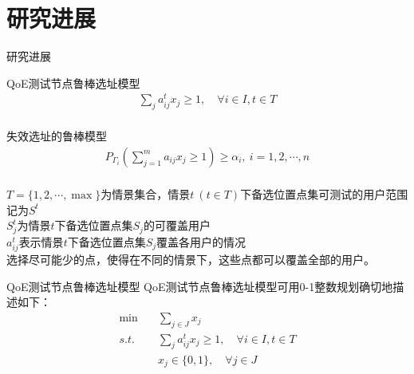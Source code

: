 \documentclass[10pt]{beamer}
\begin{document}
\section{研究进展}
\begin{frame}{研究进展}

  \begin{block}{QoE测试节点鲁棒选址模型}
    \begin{align*}
\sum_j a_{ij}^tx_j\geqslant 1,\quad \forall i\in I, t\in T\\
\end{align*}
  \end{block}

  \begin{block}{失效选址的鲁棒模型}
    \begin{align*}
    P_{\Gamma_i}(\sum_{j=1}^m a_{ij}x_j\geq 1)\geq \alpha_i,\ i=1,2,\cdots,n\\
  \end{align*}
  \end{block}

\end{frame}

\begin{frame}
$T=\{1,2,\cdots,\max\}$为情景集合，情景$t~(t\in T)$下备选位置点集可测试的用户范围记为$S^t$\\
$S^t_j$为情景$t$下备选位置点集$S_j$的可覆盖用户\\
$a_{ij}^t$表示情景$t$下备选位置点集$S_j$覆盖各用户的情况\\
选择尽可能少的点，使得在不同的情景下，这些点都可以覆盖全部的用户。
\begin{block}{QoE测试节点鲁棒选址模型}
  QoE测试节点鲁棒选址模型可用0-1整数规划确切地描述如下：
\begin{align*}
  \min \quad& \sum_{j\in J}x_j \\
s.t. \quad& \sum_j a_{ij}^tx_j\geqslant 1, \quad \forall i\in I, t\in T\\
& x_j \in \{0,1\},\quad \forall j\in J
\end{align*}
\end{block}
\end{frame}
\end{document}
